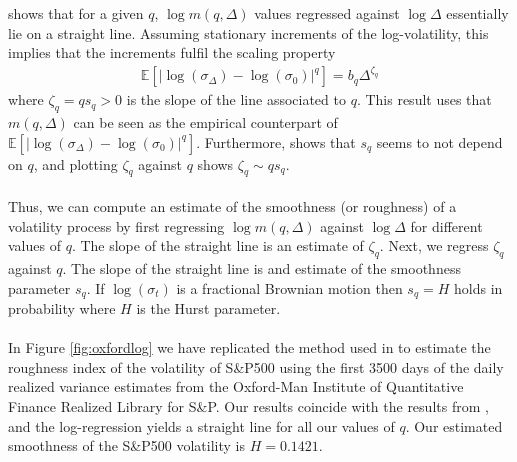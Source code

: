 \documentclass{article}
\begin{document}
\cite{gatheral} shows that for a given $q$, $\log m(q,\Delta)$ values regressed against $\log \Delta$ essentially lie on a straight line. Assuming stationary increments of the log-volatility, this implies that the increments fulfil the scaling property 
\begin{align*}
\mathbb{E}\left[ \lvert \log (\sigma_\Delta) - \log (\sigma_0) \rvert^q\right] = b_q\Delta^{\zeta _q}
\end{align*}
where $\zeta_q = qs_q>0$ is the slope of the line associated to $q$. This result uses that $m(q,\Delta)$ can be seen as the empirical counterpart of $\mathbb{E}\left[ \lvert \log (\sigma_\Delta) - \log (\sigma_0) \rvert^q\right]$. Furthermore, \cite{gatheral} shows that $s_q$ seems to not depend on $q$, and plotting $\zeta_q$ against $q$ shows $\zeta_q \sim qs_q$.\\\\
Thus, we can compute an estimate of the smoothness (or roughness) of a volatility process by first regressing $\log m(q,\Delta)$ against $\log \Delta$ for different values of $q$. The slope of the straight line is an estimate of $\zeta_q$. Next, we regress $\zeta_q$ against $q$. The slope of the straight line is and estimate of the smoothness parameter $s_q$. If $\log(\sigma_t)$ is a fractional Brownian motion then $s_q=H$ holds in probability where $H$ is the Hurst parameter.\\\\
In Figure \ref{fig:oxfordlog} we have replicated the method used in \cite{gatheral} to estimate the roughness index of the volatility of S\&P500 using the first 3500 days of the daily realized variance estimates from the Oxford-Man Institute of Quantitative Finance Realized Library for S\&P. Our results coincide with the results from \cite{gatheral}, and the log-regression yields a straight line for all our values of $q$. Our estimated smoothness of the S\&P500 volatility is $H=0.1421$.
\end{document}
